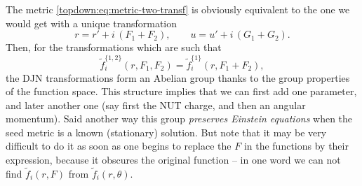 The metric \eqref{topdown:eq:metric-two-transf} is obviously equivalent to the one we would get with a unique transformation\footnotemark{}%
\begin{equation}
	r = r' + i\, (F_1 + F_2), \qquad
	u = u' + i\, (G_1 + G_2).
\end{equation} 
Then, for the transformations which are such that
\begin{equation}
	\label{topdown:eq:fi-sum-F}
	\tilde f^{\{1,2\}}_i(r, F_1, F_2) = \tilde f^{\{1\}}_i(r, F_1 + F_2),
\end{equation} 
the DJN transformations form an Abelian group thanks to the group properties of the function space.
This structure implies that we can first add one parameter, and later another one (say first the NUT charge, and then an angular momentum).
Said another way this group \emph{preserves Einstein equations} when the seed metric is a known (stationary) solution.
But note that it may be very difficult to do it as soon as one begins to replace the $F$ in the functions by their expression, because it obscures the original function – in one word we can not find $\tilde f_i(r, F)$ from $\tilde f_i(r, \theta)$.

